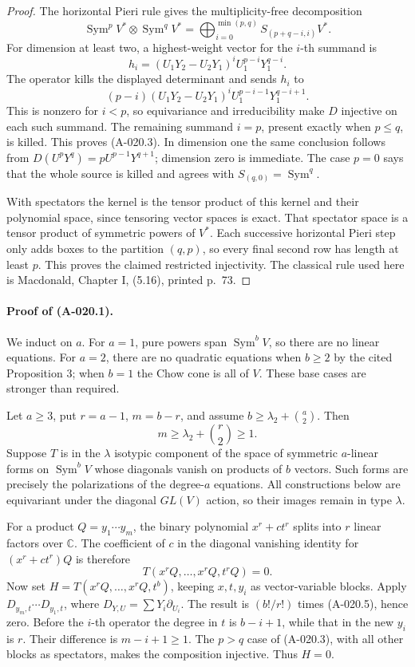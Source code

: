 \begin{proof}
The horizontal Pieri rule gives the multiplicity-free
decomposition
\[
 \operatorname{Sym}^pV^*\otimes\operatorname{Sym}^qV^*
 =\bigoplus_{i=0}^{\min(p,q)} S_{(p+q-i,i)}V^*.
\]
For dimension at least two, a highest-weight vector for the
$i$-th summand is
\[
 h_i=(U_1Y_2-U_2Y_1)^i U_1^{p-i}Y_1^{q-i}.
\]
The operator kills the displayed determinant and sends $h_i$
to
\[
 (p-i)(U_1Y_2-U_2Y_1)^i
                  U_1^{p-i-1}Y_1^{q-i+1}.
\]
This is nonzero for $i<p$, so equivariance and irreducibility
make $D$ injective on each such summand. The remaining summand
$i=p$, present exactly when $p\leq q$, is killed. This proves
(A-020.3). In dimension one the same conclusion follows from
$D(U^pY^q)=pU^{p-1}Y^{q+1}$; dimension zero is immediate.
The case $p=0$ says that the whole source is killed and agrees
with $S_{(q,0)}=\operatorname{Sym}^q$.

With spectators the kernel is the tensor product of this kernel
and their polynomial space, since tensoring vector spaces is
exact. That spectator space is a tensor product of symmetric
powers of $V^*$. Each successive horizontal Pieri step only
adds boxes to the partition $(q,p)$, so every final second row
has length at least $p$. This proves the claimed restricted
injectivity. The classical rule used here is Macdonald,
Chapter I, (5.16), printed p.~73. \end{proof}

\paragraph{Proof of (A-020.1).}
We induct on $a$. For $a=1$, pure powers span
$\operatorname{Sym}^bV$, so there are no linear equations.
For $a=2$, there are no quadratic equations when $b\geq2$
by the cited Proposition 3; when $b=1$ the Chow cone is all
of $V$. These base cases are stronger than required.

Let $a\geq3$, put $r=a-1$, $m=b-r$, and assume
$b\geq\lambda_2+\binom a2$. Then
\[
 m\geq\lambda_2+\binom r2\geq1.                       \tag{A-020.4}
\]
Suppose $T$ is in the $\lambda$ isotypic component of the
space of symmetric $a$-linear forms on $\operatorname{Sym}^bV$
whose diagonals vanish on products of $b$ vectors. Such forms
are precisely the polarizations of the degree-$a$ equations.
All constructions below are equivariant under the diagonal
$GL(V)$ action, so their images remain in type $\lambda$.

For a product $Q=y_1\cdots y_m$, the binary polynomial
$x^r+ct^r$ splits into $r$ linear factors over $\mathbb C$.
The coefficient of $c$ in the diagonal vanishing identity for
$(x^r+ct^r)Q$ is therefore
\[
                       T(x^rQ,\ldots,x^rQ,t^rQ)=0.     \tag{A-020.5}
\]
Now set $H=T(x^rQ,\ldots,x^rQ,t^b)$, keeping $x,t,y_i$
as vector-variable blocks. Apply
$D_{y_m,t}\cdots D_{y_1,t}$, where
$D_{Y,U}=\sum Y_i\partial_{U_i}$. The result is
$(b!/r!)$ times (A-020.5), hence zero. Before the $i$-th
operator the degree in $t$ is $b-i+1$, while that in the new
$y_i$ is $r$. Their difference is $m-i+1\geq1$.
The $p>q$ case of (A-020.3), with all other blocks as
spectators, makes the composition injective. Thus $H=0$.

